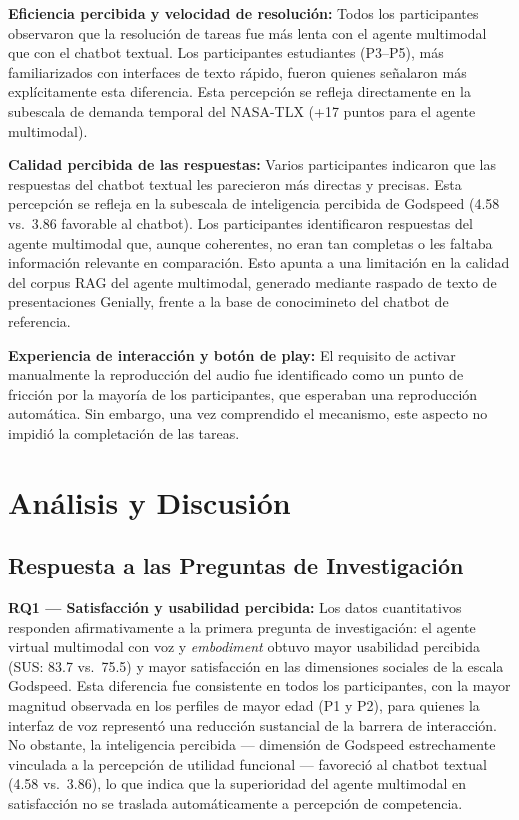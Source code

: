 \documentclass[conference]{IEEEtran}
\begin{document}
\textbf{Eficiencia percibida y velocidad de resolución:} Todos los participantes observaron que la resolución de tareas fue más lenta con el agente multimodal que con el chatbot textual. Los participantes estudiantes (P3--P5), más familiarizados con interfaces de texto rápido, fueron quienes señalaron más explícitamente esta diferencia. Esta percepción se refleja directamente en la subescala de demanda temporal del NASA-TLX (+17 puntos para el agente multimodal).

\textbf{Calidad percibida de las respuestas:} Varios participantes indicaron que las respuestas del chatbot textual les parecieron más directas y precisas. Esta percepción se refleja en la subescala de inteligencia percibida de Godspeed (4.58 vs.~3.86 favorable al chatbot). Los participantes identificaron respuestas del agente multimodal que, aunque coherentes, no eran tan completas o les faltaba información relevante en comparación. Esto apunta a una limitación en la calidad del corpus RAG del agente multimodal, generado mediante raspado de texto de presentaciones Genially, frente a la base de conocimineto del chatbot de referencia.

\textbf{Experiencia de interacción y botón de play:} El requisito de activar manualmente la reproducción del audio fue identificado como un punto de fricción por la mayoría de los participantes, que esperaban una reproducción automática. Sin embargo, una vez comprendido el mecanismo, este aspecto no impidió la completación de las tareas.

\section{Análisis y Discusión}

\subsection{Respuesta a las Preguntas de Investigación}

\textbf{RQ1 --- Satisfacción y usabilidad percibida:} Los datos cuantitativos responden afirmativamente a la primera pregunta de investigación: el agente virtual multimodal con voz y \textit{embodiment} obtuvo mayor usabilidad percibida (SUS: 83.7 vs.~75.5) y mayor satisfacción en las dimensiones sociales de la escala Godspeed. Esta diferencia fue consistente en todos los participantes, con la mayor magnitud observada en los perfiles de mayor edad (P1 y P2), para quienes la interfaz de voz representó una reducción sustancial de la barrera de interacción. No obstante, la inteligencia percibida --- dimensión de Godspeed estrechamente vinculada a la percepción de utilidad funcional --- favoreció al chatbot textual (4.58 vs.~3.86), lo que indica que la superioridad del agente multimodal en satisfacción no se traslada automáticamente a percepción de competencia.
\end{document}
